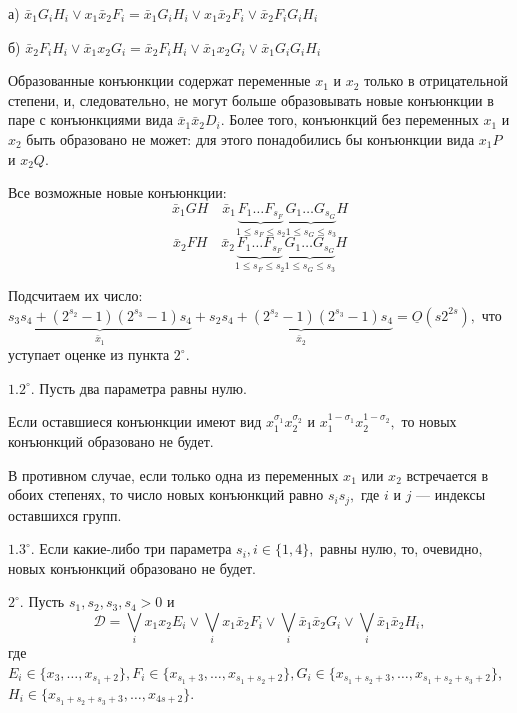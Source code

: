 \documentclass[12pt,a4paper,oneside,fleqn,leqno]{article}
\theoremstyle{definition}
\begin{document}
			а) $\bar{x}_1G_iH_i \vee x_1\bar{x}_2F_i = \bar{x}_1G_iH_i \vee x_1\bar{x}_2F_i \vee \bar{x}_2F_iG_iH_i$\par
			б) $\bar{x}_2F_iH_i \vee \bar{x}_1x_2G_i = \bar{x}_2F_iH_i \vee \bar{x}_1x_2G_i \vee \bar{x}_1G_iG_iH_i$\par
			Образованные конъюнкции содержат переменные $x_1$ и $x_2$ только в отрицательной степени, и, следовательно, не могут больше образовывать новые конъюнкции в паре с конъюнкциями вида $\bar{x}_1\bar{x}_2D_i.$ Более того, конъюнкций без переменных $x_1$ и $x_2$ быть образовано не может: для этого понадобились бы конъюнкции вида $x_1P$ и $x_2Q.$\par
			Все возможные новые конъюнкции:
			$$
				\bar{x}_1GH \quad \bar{x}_1\underbrace{F_1\ldots F_{s_F}}_{1 \leqslant s_F \leqslant s_2}\underbrace{G_1\ldots G_{s_G}}_{1 \leqslant s_G \leqslant s_3}H$$
			$$
				 \bar{x}_2FH \quad\bar{x}_2\underbrace{F_1\ldots F_{s_F}}_{1 \leqslant s_F \leqslant s_2}\underbrace{G_1\ldots G_{s_G}}_{1 \leqslant s_G \leqslant s_3}H
			$$\par
			Подсчитаем их число: $\underbrace{s_3s_4 + (2^{s_2} - 1)(2^{s_3} - 1)s_4}_{\bar{x}_1} + \underbrace{s_2s_4 + (2^{s_2} - 1)(2^{s_3} - 1)s_4}_{\bar{x}_2} = \underline{O}(s2^{2s}),$ что уступает оценке из пункта $2^{\circ}.$\par
			$1.2^{\circ}.$ Пусть два параметра равны нулю.\par
			Если оставшиеся конъюнкции имеют вид $x_1^{\sigma_1}x_2^{\sigma_2}$ и $x_1^{1 - \sigma_1}x_2^{1 - \sigma_2},$ то новых конъюнкций образовано не будет.\par
			В противном случае, если только одна из переменных $x_1$ или $x_2$ встречается в обоих степенях, то число новых конъюнкций равно $s_is_j,$ где $i$ и $j$ --- индексы оставшихся групп.\par
			$1.3^{\circ}.$ Если какие-либо три параметра $s_i, i\in\{1,4\},$ равны нулю, то, очевидно, новых конъюнкций образовано не будет.\par
			$2^{\circ}.$ Пусть $s_1, s_2, s_3, s_4 > 0$ и
			$$\mathcal{D} =\bigvee_ix_1x_2E_i \vee \bigvee_ix_1\bar{x}_2F_i \vee \bigvee_i\bar{x}_1\bar{x}_2G_i \vee \bigvee_i\bar{x}_1\bar{x}_2H_i,$$
			где $E_i \in \{x_3,\ldots,x_{s_1 + 2} \}, F_i \in \{x_{s_1 + 3}, \ldots, x_{s_1 + s_2 + 2}\}, G_i \in \{x_{s_1 + s_2 + 3}, \ldots, x_{s_1 + s_2 + s_3 + 2}\}$,\\$H_i \in \{x_{s_1 + s_2  + s_3 + 3}, \ldots, x_{4s + 2}\}.$\par
			
\end{document}
